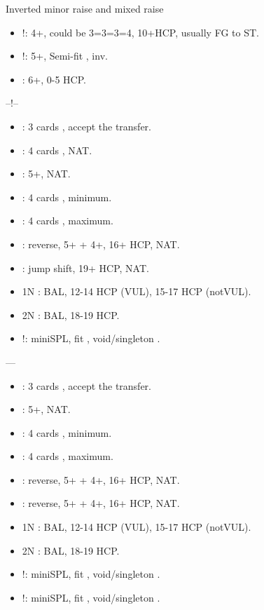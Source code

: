 \documentclass[12pt,twoside,a5paper]{report}%
\begin{document}
	Inverted minor raise and mixed raise
	\begin{itemize}
	\renewcommand{\labelitemi}{}
	\item {}!: 4+\cl{}, could be 3=3=3=4, 10+HCP, usually FG to ST. 
	\item {}!: 5+\cl{}, Semi-fit \cl{}, inv.  
	\item {} : 6+\cl{}, 0-5 HCP. 
	\end{itemize}

	--!--
	\begin{itemize}
	\renewcommand{\labelitemi}{}
	\item {} : 3 cards \he{}, accept the transfer.
	\item {} : 4 cards \sp{}, NAT.
	\item {} : 5+\cl{}, NAT.
	\item {} : 4 cards \he{}, minimum.
	\item {} : 4 cards \he{}, maximum.
	\item {} : reverse, 5+\cl{} + 4+\di{}, 16+ HCP, NAT.
	\item {} : jump shift, 19+ HCP, NAT. 
	\item 1N : BAL, 12-14 HCP (VUL), 15-17 HCP (notVUL).
	\item 2N : BAL, 18-19 HCP.
	\item {}!: miniSPL, fit \he{}, void/singleton \di{}.
	\end{itemize}

	----
	\begin{itemize}
	\renewcommand{\labelitemi}{}
	\item {} : 3 cards \sp{}, accept the transfer.
	\item {} : 5+\cl{}, NAT.
	\item {} : 4 cards \sp{}, minimum.
	\item {} : 4 cards \sp{}, maximum.
	\item {} :  reverse, 5+\cl{} + 4+\di{}, 16+ HCP, NAT.
	\item {} :  reverse, 5+\cl{} + 4+\he{}, 16+ HCP, NAT.
	\item 1N : BAL, 12-14 HCP (VUL), 15-17 HCP (notVUL).
	\item 2N : BAL, 18-19 HCP.	
	\item {}!: miniSPL, fit \sp{}, void/singleton \di{}.
	\item {}!: miniSPL, fit \sp{}, void/singleton \he{}.
	\end{itemize}
\end{document}
